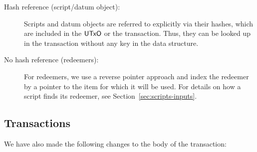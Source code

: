 \begin{description}
\item
  [Hash reference (script/datum object):]
  Scripts and datum objects are referred to explicitly via their hashes,
  which are included in the $\mathsf{UTxO}$ or the transaction. Thus, they can be
  looked up in the transaction without any key in the data structure.

  \item[No hash reference (redeemers):] For redeemers,
  we use a reverse pointer approach and
  index the redeemer by a pointer to the item for which it will be used.
  For details on how a script finds its redeemer, see Section~\ref{sec:scripts-inputs}.
\end{description}

\subsection{Transactions}
\label{sec:transctions}
We have also made the following changes to
the body of the transaction:

